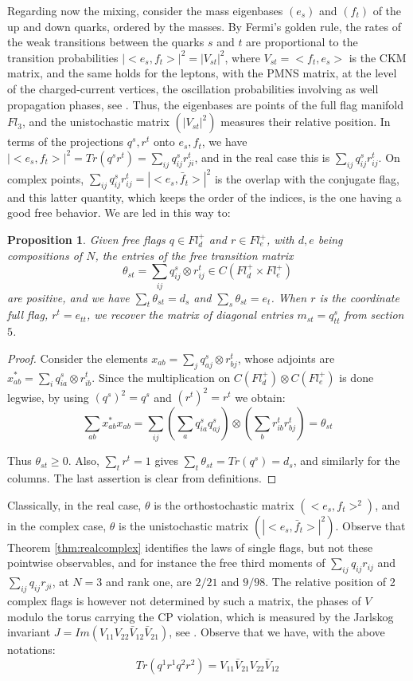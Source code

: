 \documentclass[11pt]{article}
\theoremstyle{plain}
\newtheorem{proposition}[theorem]{Proposition}
\begin{document}
Regarding now the mixing, consider the mass eigenbases $(e_s)$ and $(f_t)$ of the up and down quarks, ordered by the masses. By Fermi's golden rule, the rates of the weak transitions between the quarks $s$ and $t$ are proportional to the transition probabilities $|<e_s,f_t>|^2=|V_{st}|^2$, where $V_{st}=<f_t,e_s>$ is the CKM matrix, and the same holds for the leptons, with the PMNS matrix, at the level of the charged-current vertices, the oscillation probabilities involving as well propagation phases, see \cite{bop}. Thus, the eigenbases are points of the full flag manifold $Fl_3$, and the unistochastic matrix $(|V_{st}|^2)$ measures their relative position. In terms of the projections $q^s,r^t$ onto $e_s,f_t$, we have $|<e_s,f_t>|^2=Tr(q^sr^t)=\sum_{ij}q^s_{ij}r^t_{ji}$, and in the real case this is $\sum_{ij}q^s_{ij}r^t_{ij}$. On complex points, $\sum_{ij}q^s_{ij}r^t_{ij}=|<e_s,\bar{f}_t>|^2$ is the overlap with the conjugate flag, and this latter quantity, which keeps the order of the indices, is the one having a good free behavior. We are led in this way to:

\begin{proposition}
\label{prop:transition}
Given free flags $q\in Fl^+_d$ and $r\in Fl^+_e$, with $d,e$ being compositions of $N$, the entries of the free transition matrix
$$\theta_{st}=\sum_{ij}q^s_{ij}\otimes r^t_{ij}\in C(Fl^+_d\times Fl^+_e)$$
are positive, and we have $\sum_t\theta_{st}=d_s$ and $\sum_s\theta_{st}=e_t$. When $r$ is the coordinate full flag, $r^t=e_{tt}$, we recover the matrix of diagonal entries $m_{st}=q^s_{tt}$ from section $5$.
\end{proposition}

\begin{proof}
Consider the elements $x_{ab}=\sum_jq^s_{aj}\otimes r^t_{bj}$, whose adjoints are $x_{ab}^*=\sum_iq^s_{ia}\otimes r^t_{ib}$. Since the multiplication on $C(Fl^+_d)\otimes C(Fl^+_e)$ is done legwise, by using $(q^s)^2=q^s$ and $(r^t)^2=r^t$ we obtain:
$$\sum_{ab}x_{ab}^*x_{ab}=\sum_{ij}\left(\sum_aq^s_{ia}q^s_{aj}\right)\otimes\left(\sum_br^t_{ib}r^t_{bj}\right)=\theta_{st}$$

Thus $\theta_{st}\geq0$. Also, $\sum_tr^t=1$ gives $\sum_t\theta_{st}=Tr(q^s)=d_s$, and similarly for the columns. The last assertion is clear from definitions.
\end{proof}

Classically, in the real case, $\theta$ is the orthostochastic matrix $(<e_s,f_t>^2)$, and in the complex case, $\theta$ is the unistochastic matrix $(|<e_s,\bar{f}_t>|^2)$. Observe that Theorem \ref{thm:realcomplex} identifies the laws of single flags, but not these pointwise observables, and for instance the free third moments of $\sum_{ij}q_{ij}r_{ij}$ and $\sum_{ij}q_{ij}r_{ji}$, at $N=3$ and rank one, are $2/21$ and $9/98$. The relative position of 2 complex flags is however not determined by such a matrix, the phases of $V$ modulo the torus carrying the CP violation, which is measured by the Jarlskog invariant $J=Im(V_{11}V_{22}\bar{V}_{12}\bar{V}_{21})$, see \cite{jar}. Observe that we have, with the above notations:
$$Tr(q^1r^1q^2r^2)=V_{11}\bar{V}_{21}V_{22}\bar{V}_{12}$$
\end{document}
